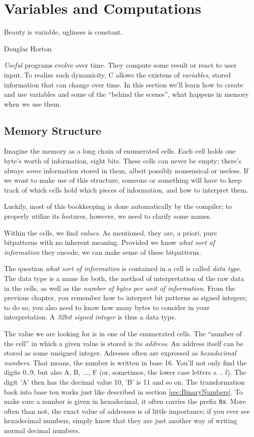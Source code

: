\chapter{Variables and Computations}\label{chp:expressions}
\epigraph{Beauty is variable, ugliness is constant.}{Douglas Horton}

\emph{Useful} programs evolve over time. They compute some result or react to user input. To realize such dynamicity, C allows the existens of \emph{variables}, \ie stored information that can change over time. In this section we'll learn how to create and use variables and some of the \enquote{behind the scenes}, \ie what happens in memory when we use them.

\section{Memory Structure}
Imagine the memory as a long chain of enumerated cells. Each cell holds one byte's worth of information, \ie eight bits. These cells can never be empty; there's always \emph{some} information stored in them, albeit possibly nonsensical or useless. If we want to make use of this structure, someone or something will have to keep track of which cells hold which pieces of information, and how to interpret them.

Luckily, most of this bookkeeping is done automatically by the compiler; to properly utilize its features, however, we need to clarify some names.

Within the cells, we find \emph{values}. As mentioned, they are, a priori, pure bitpatterns with no inherent meaning. Provided we know \emph{what sort of information} they encode, we can make sense of these bitpatterns.

The question \emph{what sort of information} is contained in a cell is called \emph{data type}. The data type is a name for both, the method of interpretation of the raw data in the cells, as well as the \emph{number of bytes per unit of information}. From the previous chapter, you remember how to interpret bit patterns as signed integers; to do so, you also need to know how many bytes to consider in your interpretation. A \emph{32bit signed integer} is thus a data type.

The value we are looking for is in one of the enumerated cells. The \enquote{number of the cell} in which a given value is stored is its \emph{address}. An address itself can be stored as some unsigned integer. Adresses often are expressed as \emph{hexadecimal numbers}. That means, the number is written in base 16. You'll not only find the digits 0..9, but also A, B, ..., F (or, sometimes, the lower case letters a .. f). The digit 'A' then has the decimal value 10, 'B' is 11 and so on. The transformation back into base ten works just like described in section \ref{sec:BinaryNumbers}. To make sure a number is given in hexadecimal, it often carries the prefix \texttt{0x}. More often than not, the exact value of addresses is of little importance; if you ever see hexadecimal numbers, simply know that they are just another way of writing normal decimal numbers.

